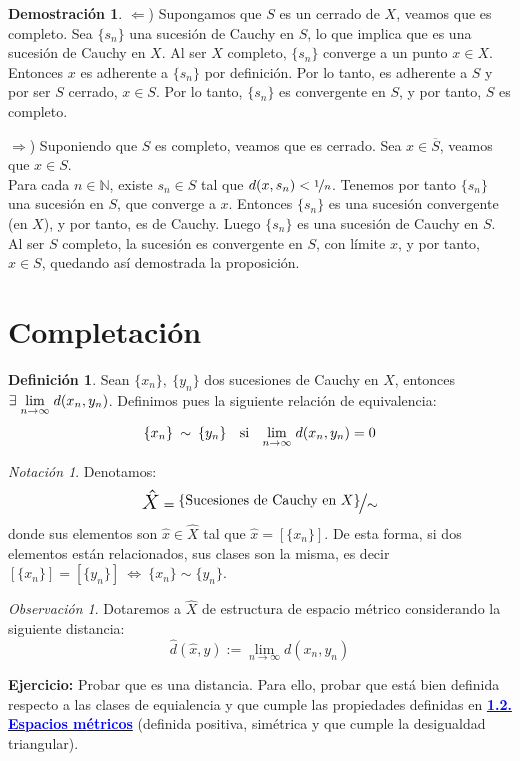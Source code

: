 \documentclass[12pt,twoside]{report}
\theoremstyle{azul}
\theoremstyle{azul2}
\theoremstyle{plain}
\theoremstyle{definition}
\newtheorem*{defi}{Definición}
\newtheorem*{dem}{Demostración}
\theoremstyle{remark}
\newtheorem*{obs}{Observación}
\newtheorem*{nota}{Notación}
\begin{document}
\begin{dem} \: 
\justifying

$\Leftarrow$) 
Supongamos que $S$ es un cerrado de $X$, veamos que es completo. Sea $\{s_n\}$ una sucesión de Cauchy en $S$, lo que implica que es una sucesión de Cauchy en $X$. Al ser $X$ completo, $\{s_n\}$ converge a un punto $x \in X$. Entonces $x$ es adherente a $\{s_n\}$ por definición. Por lo tanto, es adherente a $S$ y por ser $S$ cerrado, $x \in S$. Por lo tanto, $\{ s_n \}$ es convergente en $S$, y por tanto, $S$ es completo.

$\Rightarrow$) Suponiendo que $S$ es completo, veamos que es cerrado. Sea $x \in \overline{S}$, veamos que $x \in S$.\\
Para cada $n \in \mathbb{N}$, existe $s_n \in S$ tal que $d(x, s_n) < \nicefrac{1}{n}$. Tenemos por tanto $\{s_n\}$ una sucesión en $S$, que converge a $x$. Entonces $\{s_n\}$ es una sucesión convergente (en $X$), y por tanto, es de Cauchy. Luego $\{s_n\}$ es una sucesión de Cauchy en $S$. Al ser $S$ completo, la sucesión es convergente en $S$, con límite $x$, y por tanto, $x \in S$, quedando así demostrada la proposición.
\end{dem}

\section{Completación}
\begin{defi}
Sean $\{ x_n \},\: \{ y_n \} $ dos sucesiones de Cauchy en $X$, entonces $\mathlarger{\exists} \; \underset{n \to \infty}{\lim} \; d(x_n, y_n)$. Definimos pues la siguiente relación de equivalencia:
$$\{ x_n \} \: \sim \: \{ y_n \} \text{ \; si \; } \underset{n \to \infty}{\lim} \; d(x_n, y_n)=0$$ 
\end{defi}
\begin{nota}
Denotamos:
$$\mathlarger{\mathlarger{\hat{X}}}=\mathlarger{\mathlarger{\nicefrac{\{ \text{Sucesiones de Cauchy en } X\}}{ \sim }}}$$
donde sus elementos son $\hat{x} \in \hat{X}$ tal que $\hat{x}=[\{x_n\}]$. De esta forma, si dos elementos están relacionados, sus clases son la misma, es decir $[\{x_n\}] = [\{y_n\}] \: \Leftrightarrow \: \{x_n\} \sim \{y_n\}$.
\end{nota}
\begin{obs}
Dotaremos a $\hat{X}$ de estructura de espacio métrico considerando la siguiente distancia: 
$$\hat{d}(\hat{x}, \hat{y}) := \underset{n \to \infty}{\lim} d(x_n, y_n)$$
\end{obs}
\textbf{Ejercicio:} Probar que es una distancia. Para ello, probar que está bien definida respecto a las clases de equialencia y que cumple las propiedades definidas en \hyperref[dist]{\textcolor{blue}{\textbf{1.2. Espacios m{\'e}tricos}}} (definida positiva, simétrica y que cumple la desigualdad triangular).
\end{document}
